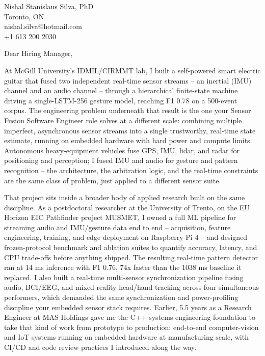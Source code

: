 \documentclass[11pt]{article}
\begin{document}
\pagestyle{empty}

\begin{flushright}
Nishal Stanislaus Silva, PhD \\
Toronto, ON \\
nishal.silva@hotmail.com \\
+1 613 200 2030
\end{flushright}

Dear Hiring Manager,

At McGill University's IDMIL/CIRMMT lab, I built a self-powered smart electric guitar that fused two independent real-time sensor streams -- an inertial (IMU) channel and an audio channel -- through a hierarchical finite-state machine driving a single-LSTM-256 gesture model, reaching F1 0.78 on a 500-event corpus. The engineering problem underneath that result is the one your Sensor Fusion Software Engineer role solves at a different scale: combining multiple imperfect, asynchronous sensor streams into a single trustworthy, real-time state estimate, running on embedded hardware with hard power and compute limits. Autonomous heavy-equipment vehicles fuse GPS, IMU, lidar, and radar for positioning and perception; I fused IMU and audio for gesture and pattern recognition -- the architecture, the arbitration logic, and the real-time constraints are the same class of problem, just applied to a different sensor suite.

That project sits inside a broader body of applied research built on the same discipline. As a postdoctoral researcher at the University of Trento, on the EU Horizon EIC Pathfinder project MUSMET, I owned a full ML pipeline for streaming audio and IMU/gesture data end to end -- acquisition, feature engineering, training, and edge deployment on Raspberry Pi 4 -- and designed frozen-protocol benchmark and ablation suites to quantify accuracy, latency, and CPU trade-offs before anything shipped. The resulting real-time pattern detector ran at 14 ms inference with F1 0.76, 74x faster than the 1038 ms baseline it replaced. I also built a real-time multi-sensor synchronization pipeline fusing audio, BCI/EEG, and mixed-reality head/hand tracking across four simultaneous performers, which demanded the same synchronization and power-profiling discipline your embedded sensor stack requires. Earlier, 5.5 years as a Research Engineer at MAS Holdings gave me the C++ systems-engineering foundation to take that kind of work from prototype to production: end-to-end computer-vision and IoT systems running on embedded hardware at manufacturing scale, with CI/CD and code review practices I introduced along the way.
\end{document}
